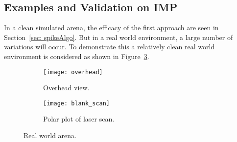 %
%
%
%
%
%

\subsection{Examples and Validation on IMP}
\label{sec:Spike_results}

In a clean simulated arena, the efficacy of the first approach are seen in Section~\ref{sec: spikeAlgo}. But in a real world environment, a large number of variations will occur. To demonstrate this a relatively clean real world environment is considered as shown in Figure~\ref{fig:Real world arena}. 
\begin{figure}[h!]
    \centering
    \begin{subfigure}[b]{0.45\textwidth}
    
	    \texttt{[image: overhead]}
	    \caption{Overhead view.}
	    \label{fig:overhead}
    \end{subfigure}
    \quad %
    \begin{subfigure}[b]{0.45\textwidth}
        \texttt{[image: blank\_scan]}
        \caption{Polar plot of laser scan.}
        \label{fig:spike_scan}
    \end{subfigure}%
        \caption{Real world arena.}
        \label{fig:Real world arena}
\end{figure}

